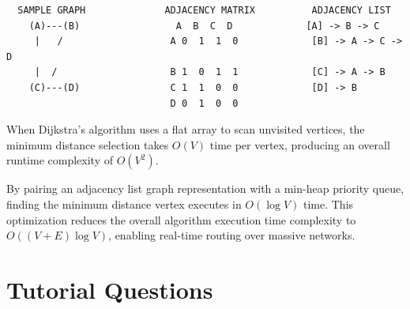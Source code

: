 \documentclass[12pt]{report}
\begin{document}
\begin{verbatim}
  SAMPLE GRAPH              ADJACENCY MATRIX          ADJACENCY LIST
    (A)---(B)                 A  B  C  D             [A] -> B -> C
     |   /                   A 0  1  1  0             [B] -> A -> C -> D
     |  /                    B 1  0  1  1             [C] -> A -> B
    (C)---(D)                C 1  1  0  0             [D] -> B
                             D 0  1  0  0
\end{verbatim}

When Dijkstra's algorithm uses a flat array to scan unvisited vertices, the minimum distance selection takes $O(V)$ time per vertex, producing an overall runtime complexity of $O(V^2)$. 

By pairing an adjacency list graph representation with a min-heap priority queue, finding the minimum distance vertex executes in $O(\log V)$ time. This optimization reduces the overall algorithm execution time complexity to $O((V + E) \log V)$, enabling real-time routing over massive networks.

\section*{Tutorial Questions}
\end{document}
